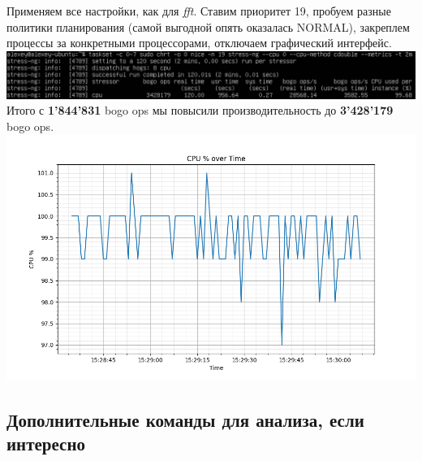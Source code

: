 Применяем все настройки, как для \textit{fft}. Ставим приоритет 19, пробуем разные политики планирования (самой выгодной опять оказалась NORMAL), закреплем процессы за конкретными процессорами, отключаем графический интерфейс.\\
\includegraphics[width=\textwidth]{image/cpu-cdouble-max.png}
Итого с \textbf{1'844'831} bogo ops мы повысили производительность до \textbf{3'428'179} bogo ops.\\
\includegraphics[width=\textwidth]{image/cpu_usage_max.png}

\subsection{Дополнительные команды для анализа, если интересно}
